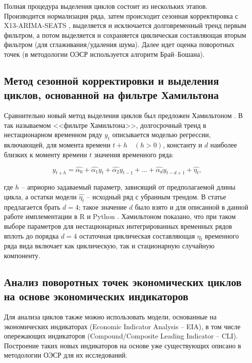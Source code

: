 \documentclass[../report.tex]{subfiles}
\begin{document}
	Полная процедура выделения циклов состоит из нескольких этапов. Производится нормализация ряда, затем происходит сезонная корректировка с X13-ARIMA-SEATS \cite{seasonalManual}, выделяется и исключается долговременный тренд первым фильтром, а потом выделяется и сохраняется циклическая составляющая вторым фильтром (для сглаживания/удаления шума). Далее идет оценка поворотных точек (в методологии ОЭСР \cite{oecdCycleExtraction} используется алгоритм Брай–Бошана).
	
	\subsection{Метод сезонной корректировки и выделения циклов, основанной на фильтре Хамильтона}
	
	Сравнительно новый метод выделения циклов был предложен Хамильтоном \cite{hamNewApproach}. В так называемом <<фильтре Хамильтона>>, долгосрочный тренд в нестационарном временном ряду $y_t$  описывается моделью регрессии, включающей, для момента времени  $t+h \quad (h>0)$, константу и $d$ наиболее близких к моменту времени $t$ значения временного ряда:
	
	\begin{equation}
	y_{t+h} = \hat{\alpha_{0}} + \hat{\alpha_{1}}y_{t} + \hat{\alpha_{2}}y_{t-1}
	+ ... + \hat{\alpha_{d}}y_{t-d+1} + \hat{\eta_{t}},
	\end{equation}
	
	где $h$ – априорно задаваемый параметр, зависящий от предполагаемой длины цикла, а остатки модели $\hat{\eta_{t}}$ – исходный ряд с убранным трендом. В статье предлагается брать $d=4$; такое значение $d$ было взято и для описанной в данной работе имплементации в R и Python \cite{makarevich_bsu_conf_2017}. Хамильтоном показано, что при таком выборе параметров для нестационарных интегрированных временных рядов вплоть до порядка $d=4$ остаточная циклическая составляющая $\eta_{t}$ временного ряда вида включает как циклическую, так и стационарную случайную компоненту. 
	
	
	\subsection{Анализ поворотных точек экономических циклов на основе экономических индикаторов}
	
	Для анализа циклов также можно использовать модели, основанные на экономических индикаторах (Economic Indicator Analysis – EIA), в том числе опережающих индикаторов (Compound/Composite Leading Indicator – CLI). Построение таких новых индикаторов на основе уже существующих описано в методологии ОЭСР \cite{oecdCLI} для их исследований. 
	
\end{document}
